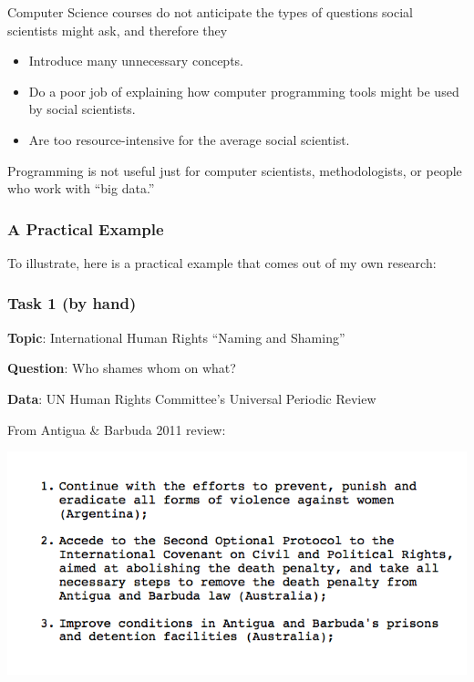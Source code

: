\documentclass[]{book}
\providecommand{\tightlist}{%
  \setlength{\itemsep}{0pt}\setlength{\parskip}{0pt}}
\begin{document}
Computer Science courses do not anticipate the types of questions social
scientists might ask, and therefore they

\begin{itemize}
\tightlist
\item
  Introduce many unnecessary concepts.
\item
  Do a poor job of explaining how computer programming tools might be
  used by social scientists.
\item
  Are too resource-intensive for the average social scientist.
\end{itemize}

Programming is not useful just for computer scientists, methodologists,
or people who work with ``big data.''

\subsubsection*{A Practical Example}\label{a-practical-example}

To illustrate, here is a practical example that comes out of my own
research:

\subsubsection*{Task 1 (by hand)}\label{task-1-by-hand}

\textbf{Topic}: International Human Rights ``Naming and Shaming''

\textbf{Question}: Who shames whom on what?

\textbf{Data}: UN Human Rights Committee's Universal Periodic Review

From Antigua \& Barbuda 2011 review:

\begin{center}\includegraphics[width=0.7\linewidth]{img/upr-text} \end{center}
\end{document}
